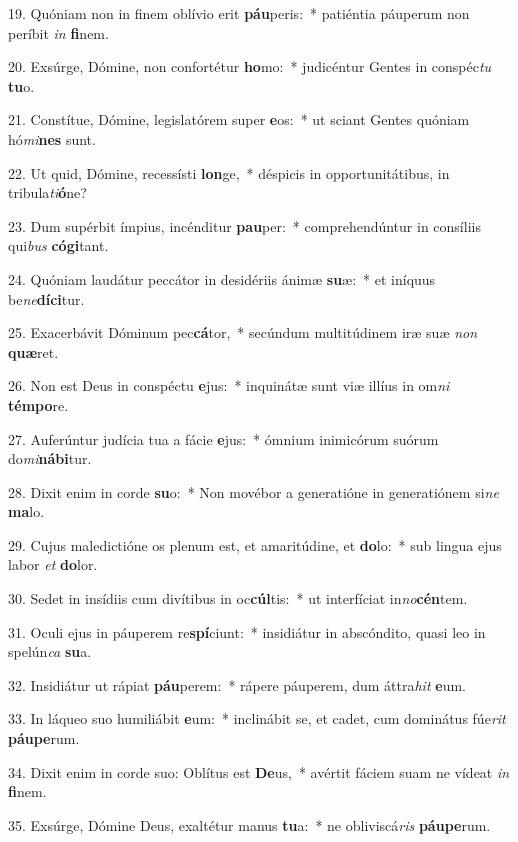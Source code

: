 19. Quóniam non in finem oblívio erit \textbf{páu}peris:~*  patiéntia páuperum non períbit \textit{in} \textbf{fi}nem.\

20. Exsúrge, Dómine, non confortétur \textbf{ho}mo:~*  judicéntur Gentes in conspéc\textit{tu} \textbf{tu}o.\

21. Constítue, Dómine, legislatórem super \textbf{e}os:~*  ut sciant Gentes quóniam hó\textit{mi}\textbf{nes} sunt.\

22. Ut quid, Dómine, recessísti \textbf{lon}ge,~*  déspicis in opportunitátibus, in tribula\textit{ti}\textbf{ó}ne?\

23. Dum supérbit ímpius, incénditur \textbf{pau}per:~*  comprehendúntur in consíliis qui\textit{bus} \textbf{có}\textbf{gi}tant.\

24. Quóniam laudátur peccátor in desidériis ánimæ \textbf{su}æ:~*  et iníquus be\textit{ne}\textbf{dí}\textbf{ci}tur.\

25. Exacerbávit Dóminum pec\textbf{cá}tor,~*  secúndum multitúdinem iræ suæ \textit{non} \textbf{quæ}ret.\

26. Non est Deus in conspéctu \textbf{e}jus:~*  inquinátæ sunt viæ illíus in om\textit{ni} \textbf{tém}\textbf{po}re.\

27. Auferúntur judícia tua a fácie \textbf{e}jus:~*  ómnium inimicórum suórum do\textit{mi}\textbf{ná}\textbf{bi}tur.\

28. Dixit enim in corde \textbf{su}o:~*  Non movébor a generatióne in generatiónem si\textit{ne} \textbf{ma}lo.\

29. Cujus maledictióne os plenum est, et amaritúdine, et \textbf{do}lo:~*  sub lingua ejus labor \textit{et} \textbf{do}lor.\

30. Sedet in insídiis cum divítibus in oc\textbf{cúl}tis:~*  ut interfíciat in\textit{no}\textbf{cén}tem.\

31. Oculi ejus in páuperem re\textbf{spí}ciunt:~*  insidiátur in abscóndito, quasi leo in spelún\textit{ca} \textbf{su}a.\

32. Insidiátur ut rápiat \textbf{páu}perem:~*  rápere páuperem, dum áttra\textit{hit} \textbf{e}um.\

33. In láqueo suo humiliábit \textbf{e}um:~*  inclinábit se, et cadet, cum dominátus fúe\textit{rit} \textbf{páu}\textbf{pe}rum.\

34. Dixit enim in corde suo: Oblítus est \textbf{De}us,~*  avértit fáciem suam ne vídeat \textit{in} \textbf{fi}nem.\

35. Exsúrge, Dómine Deus, exaltétur manus \textbf{tu}a:~*  ne obliviscá\textit{ris} \textbf{páu}\textbf{pe}rum.\

